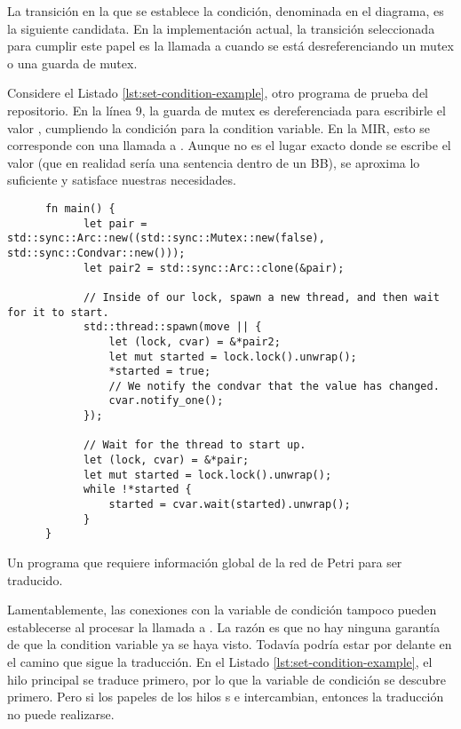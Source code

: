 La transición en la que se establece la condición, denominada  en el diagrama,
es la siguiente candidata. En la implementación actual, la transición seleccionada para cumplir este
papel es la llamada a  cuando se está desreferenciando un mutex o
una guarda de mutex.

Considere el Listado \ref{lst:set-condition-example},
otro programa de prueba del repositorio.
En la línea 9, la guarda de mutex es dereferenciada para escribirle el valor ,
cumpliendo la condición para la condition variable.
En la \acrshort{MIR}, esto se corresponde con una llamada a
.
Aunque no es el lugar exacto donde se escribe el valor (que en
realidad sería una sentencia dentro de un \acrshort{BB}),
se aproxima lo suficiente y satisface nuestras necesidades.

\begin{listing}[!htbp]
      \begin{verbatim}
      fn main() {
            let pair = std::sync::Arc::new((std::sync::Mutex::new(false), std::sync::Condvar::new()));
            let pair2 = std::sync::Arc::clone(&pair);
        
            // Inside of our lock, spawn a new thread, and then wait for it to start.
            std::thread::spawn(move || {
                let (lock, cvar) = &*pair2;
                let mut started = lock.lock().unwrap();
                *started = true;
                // We notify the condvar that the value has changed.
                cvar.notify_one();
            });
        
            // Wait for the thread to start up.
            let (lock, cvar) = &*pair;
            let mut started = lock.lock().unwrap();
            while !*started {
                started = cvar.wait(started).unwrap();
            }
      }              
      \end{verbatim}
      \caption{Un programa que requiere información global de la red de Petri para ser traducido.}
      \label{lst:set-condition-example}
\end{listing}

Lamentablemente, las conexiones con la variable de condición tampoco pueden establecerse al
procesar la llamada a .
La razón es que no hay ninguna garantía de que la condition variable ya se haya visto.
Todavía podría estar por delante en el camino que sigue la traducción.
En el Listado \ref{lst:set-condition-example}, el hilo principal se traduce primero,
por lo que la variable de condición se descubre primero.
Pero si los papeles de los hilos s e intercambian, entonces la traducción no puede realizarse.

